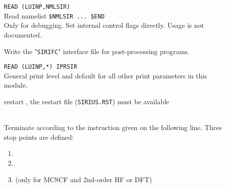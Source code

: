 \begin{description}

\item[]
  \verb"READ (LUINP,NMLSIR)" \\
  Read namelist \verb"$NMLSIR ... $END" \\
  Only for debugging. Set internal control flags directly.
  Usage is not documented.

\item[]
  Write the "\verb|SIRIFC|" interface file for post-processing programs.


\item[]
  \verb"READ (LUINP,*) IPRSIR" \\
  General {\sir} print level and default for all other print parameters in this module.

\item[]
  restart {\sir},
  the {\sir} restart file (\verb|SIRIUS.RST|) must be available


\item[]
   \\
  Terminate {\sir} according to the instruction given on the following line.
  Three stop points are defined:
\begin{enumerate}

\item \hspace{2em} 

\item \hspace{2em} 

\item \hspace{2em}  (only for MCSCF and 2nd-order HF or DFT)
\end{enumerate}


\end{description}
